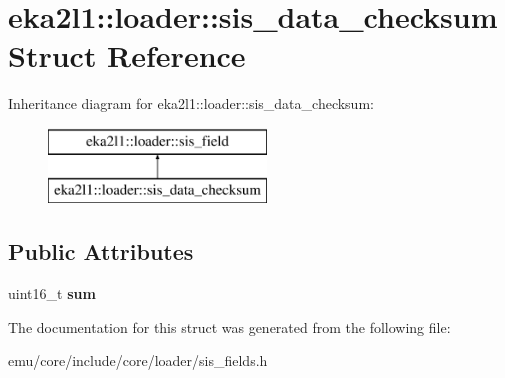 \hypertarget{structeka2l1_1_1loader_1_1sis__data__checksum}{}\section{eka2l1\+:\+:loader\+:\+:sis\+\_\+data\+\_\+checksum Struct Reference}
\label{structeka2l1_1_1loader_1_1sis__data__checksum}
Inheritance diagram for eka2l1\+:\+:loader\+:\+:sis\+\_\+data\+\_\+checksum\+:\begin{figure}[H]
\begin{center}
\leavevmode
\includegraphics[height=2.000000cm]{structeka2l1_1_1loader_1_1sis__data__checksum}
\end{center}
\end{figure}
\subsection*{Public Attributes}
\begin{DoxyCompactItemize}
\item 
\mbox{\label{structeka2l1_1_1loader_1_1sis__data__checksum_ac6b91a0bc68608dc084787b07bfd466f}} 
uint16\+\_\+t {\bfseries sum}
\end{DoxyCompactItemize}


The documentation for this struct was generated from the following file\+:\begin{DoxyCompactItemize}
\item 
emu/core/include/core/loader/sis\+\_\+fields.\+h\end{DoxyCompactItemize}
